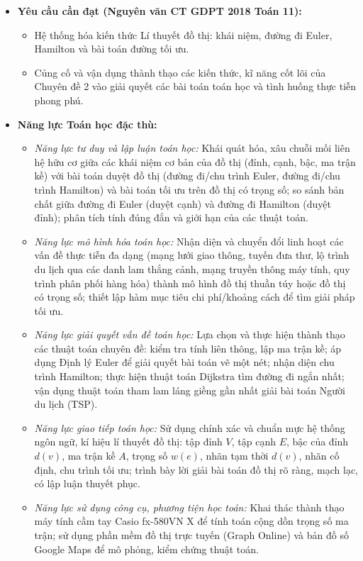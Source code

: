 \documentclass[12pt, a4paper]{article}
\begin{document}
\begin{itemize}[leftmargin=1.2cm]
    \item \textbf{Yêu cầu cần đạt (Nguyên văn CT GDPT 2018 Toán 11):}
    \begin{itemize}[leftmargin=0.6cm]
        \item Hệ thống hóa kiến thức Lí thuyết đồ thị: khái niệm, đường đi Euler, Hamilton và bài toán đường tối ưu.
        \item Củng cố và vận dụng thành thạo các kiến thức, kĩ năng cốt lõi của Chuyên đề 2 vào giải quyết các bài toán toán học và tình huống thực tiễn phong phú.
    \end{itemize}

    \item \textbf{Năng lực Toán học đặc thù:}
    \begin{itemize}[leftmargin=0.6cm]
        \item \textit{Năng lực tư duy và lập luận toán học:} Khái quát hóa, xâu chuỗi mối liên hệ hữu cơ giữa các khái niệm cơ bản của đồ thị (đỉnh, cạnh, bậc, ma trận kề) với bài toán duyệt đồ thị (đường đi/chu trình Euler, đường đi/chu trình Hamilton) và bài toán tối ưu trên đồ thị có trọng số; so sánh bản chất giữa đường đi Euler (duyệt cạnh) và đường đi Hamilton (duyệt đỉnh); phân tích tính đúng đắn và giới hạn của các thuật toán.
        \item \textit{Năng lực mô hình hóa toán học:} Nhận diện và chuyển đổi linh hoạt các vấn đề thực tiễn đa dạng (mạng lưới giao thông, tuyến đưa thư, lộ trình du lịch qua các danh lam thắng cảnh, mạng truyền thông máy tính, quy trình phân phối hàng hóa) thành mô hình đồ thị thuần túy hoặc đồ thị có trọng số; thiết lập hàm mục tiêu chi phí/khoảng cách để tìm giải pháp tối ưu.
        \item \textit{Năng lực giải quyết vấn đề toán học:} Lựa chọn và thực hiện thành thạo các thuật toán chuyên đề: kiểm tra tính liên thông, lập ma trận kề; áp dụng Định lý Euler để giải quyết bài toán vẽ một nét; nhận diện chu trình Hamilton; thực hiện thuật toán Dijkstra tìm đường đi ngắn nhất; vận dụng thuật toán tham lam láng giềng gần nhất giải bài toán Người du lịch (TSP).
        \item \textit{Năng lực giao tiếp toán học:} Sử dụng chính xác và chuẩn mực hệ thống ngôn ngữ, kí hiệu lí thuyết đồ thị: tập đỉnh $V$, tập cạnh $E$, bậc của đỉnh $d(v)$, ma trận kề $A$, trọng số $w(e)$, nhãn tạm thời $d(v)$, nhãn cố định, chu trình tối ưu; trình bày lời giải bài toán đồ thị rõ ràng, mạch lạc, có lập luận thuyết phục.
        \item \textit{Năng lực sử dụng công cụ, phương tiện học toán:} Khai thác thành thạo máy tính cầm tay Casio fx-580VN X để tính toán cộng dồn trọng số ma trận; sử dụng phần mềm đồ thị trực tuyến (Graph Online) và bản đồ số Google Maps để mô phỏng, kiểm chứng thuật toán.
    \end{itemize}


\end{itemize}
\end{document}
